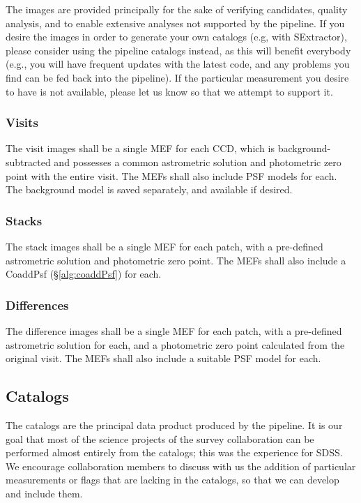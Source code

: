 \documentclass[12pt]{article}
\begin{document}
The images are provided principally for the sake of verifying candidates, quality analysis, and to enable
extensive analyses not supported by the pipeline.  If you desire the images in order to generate your own
catalogs (e.g, with SExtractor), please consider using the pipeline catalogs instead, as this will benefit
everybody (e.g., you will have frequent updates with the latest code, and any problems you find can be fed
back into the pipeline).  If the particular measurement you desire to have is not available, please let us
know so that we attempt to support it.

\subsubsection{Visits}

The visit images shall be a single MEF for each CCD, which is background-subtracted and possesses a common
astrometric solution and photometric zero point with the entire visit.  The MEFs shall also include PSF models
for each.  The background model is saved separately, and available if desired.

\subsubsection{Stacks}

The stack images shall be a single MEF for each patch, with a pre-defined astrometric solution and photometric
zero point.  The MEFs shall also include a CoaddPsf (\S\ref{alg:coaddPsf}) for each.

\subsubsection{Differences}

The difference images shall be a single MEF for each patch, with a pre-defined astrometric solution for each,
and a photometric zero point calculated from the original visit.  The MEFs shall also include a suitable PSF
model for each.

\subsection{Catalogs}

The catalogs are the principal data product produced by the pipeline.  It is our goal that most of the science
projects of the survey collaboration can be performed almost entirely from the catalogs; this was the
experience for SDSS.  We encourage collaboration members to discuss with us the addition of particular
measurements or flags that are lacking in the catalogs, so that we can develop and include them.
\end{document}
